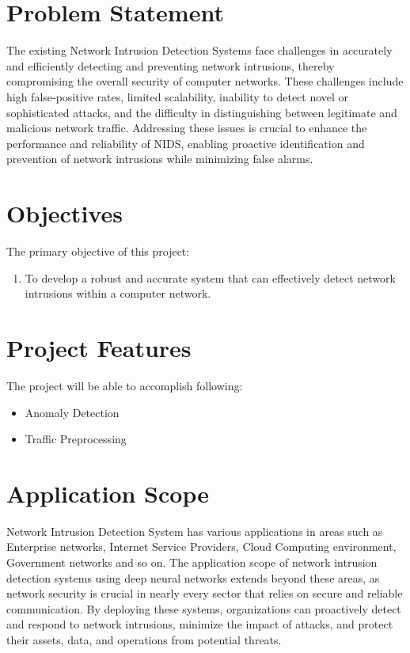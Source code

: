 \section{Problem Statement}
\vspace{-18pt}
The existing Network Intrusion Detection Systems face challenges in accurately and efficiently detecting and preventing network intrusions, thereby compromising the overall security of computer networks. These challenges include high false-positive rates, limited scalability, inability to detect novel or sophisticated attacks, and the difficulty in distinguishing between legitimate and malicious network traffic. Addressing these issues is crucial to enhance the performance and reliability of NIDS, enabling proactive identification and prevention of network intrusions while minimizing false alarms.
\section{Objectives}
\vspace{-18pt}
The primary objective of this project:
\vspace{-18pt}
\begin{enumerate}[label=\roman*.]
\item To develop a robust and accurate system that can effectively detect network intrusions within a computer network.
\end{enumerate}
\section{Project Features}
\vspace{-18pt}
The project will be able to accomplish following:
\vspace{-18pt}
\begin{itemize}
\item Anomaly Detection
\item Traffic Preprocessing
\end{itemize}
\section{Application Scope}
\vspace{-18pt}
Network Intrusion Detection System has various applications in areas such as Enterprise networks, Internet Service Providers, Cloud Computing environment, Government networks and so on. The application scope of network intrusion detection systems using deep neural networks extends beyond these areas, as network security is crucial in nearly every sector that relies on secure and reliable communication. By deploying these systems, organizations can proactively detect and respond to network intrusions, minimize the impact of attacks, and protect their assets, data, and operations from potential threats.
